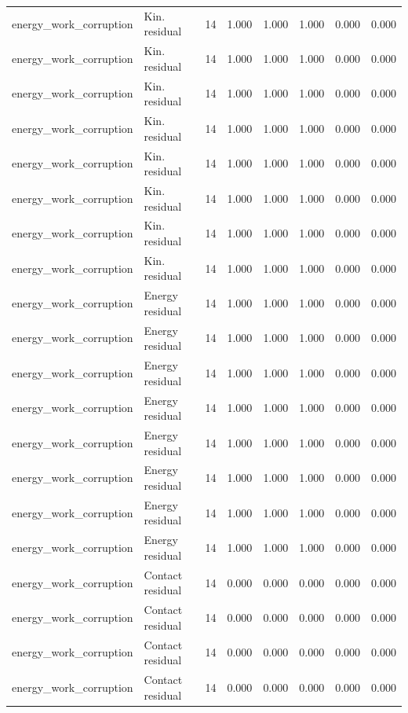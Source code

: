 {\begin{longtable}{llrrrrrr}
energy\_work\_corruption & Kin. residual & 14 & 1.000 & 1.000 & 1.000 & 0.000 & 0.000 \\
energy\_work\_corruption & Kin. residual & 14 & 1.000 & 1.000 & 1.000 & 0.000 & 0.000 \\
energy\_work\_corruption & Kin. residual & 14 & 1.000 & 1.000 & 1.000 & 0.000 & 0.000 \\
energy\_work\_corruption & Kin. residual & 14 & 1.000 & 1.000 & 1.000 & 0.000 & 0.000 \\
energy\_work\_corruption & Kin. residual & 14 & 1.000 & 1.000 & 1.000 & 0.000 & 0.000 \\
energy\_work\_corruption & Kin. residual & 14 & 1.000 & 1.000 & 1.000 & 0.000 & 0.000 \\
energy\_work\_corruption & Kin. residual & 14 & 1.000 & 1.000 & 1.000 & 0.000 & 0.000 \\
energy\_work\_corruption & Kin. residual & 14 & 1.000 & 1.000 & 1.000 & 0.000 & 0.000 \\
energy\_work\_corruption & Energy residual & 14 & 1.000 & 1.000 & 1.000 & 0.000 & 0.000 \\
energy\_work\_corruption & Energy residual & 14 & 1.000 & 1.000 & 1.000 & 0.000 & 0.000 \\
energy\_work\_corruption & Energy residual & 14 & 1.000 & 1.000 & 1.000 & 0.000 & 0.000 \\
energy\_work\_corruption & Energy residual & 14 & 1.000 & 1.000 & 1.000 & 0.000 & 0.000 \\
energy\_work\_corruption & Energy residual & 14 & 1.000 & 1.000 & 1.000 & 0.000 & 0.000 \\
energy\_work\_corruption & Energy residual & 14 & 1.000 & 1.000 & 1.000 & 0.000 & 0.000 \\
energy\_work\_corruption & Energy residual & 14 & 1.000 & 1.000 & 1.000 & 0.000 & 0.000 \\
energy\_work\_corruption & Energy residual & 14 & 1.000 & 1.000 & 1.000 & 0.000 & 0.000 \\
energy\_work\_corruption & Contact residual & 14 & 0.000 & 0.000 & 0.000 & 0.000 & 0.000 \\
energy\_work\_corruption & Contact residual & 14 & 0.000 & 0.000 & 0.000 & 0.000 & 0.000 \\
energy\_work\_corruption & Contact residual & 14 & 0.000 & 0.000 & 0.000 & 0.000 & 0.000 \\
energy\_work\_corruption & Contact residual & 14 & 0.000 & 0.000 & 0.000 & 0.000 & 0.000 \\

\end{longtable}}
